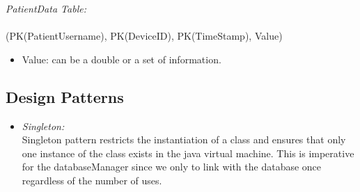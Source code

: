 	\emph{PatientData Table:}\\\\
		(PK(PatientUsername), PK(DeviceID), PK(TimeStamp), Value)\\
		\begin{itemize}
			\item Value: can be a double or a set of information.\\
		\end{itemize}
		
\subsection*{\textbf{Design Patterns}}	
\begin{itemize}
\item \emph{Singleton:\\} Singleton pattern restricts the instantiation of a class and ensures that only one instance of the class exists in the java virtual machine. This is imperative for the databaseManager since we only to link with the database once regardless of the number of uses.
\end{itemize}	

		
		